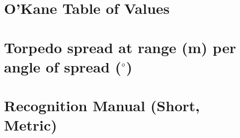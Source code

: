 \documentclass{article}
\newcommand{\degree}{$^{\circ}$}
\begin{document}
\section{O'Kane Table of Values}

\pagebreak

\section{Torpedo spread at range (m) per angle of spread (\degree)}


\pagebreak

\section{Recognition Manual (Short, Metric)}

\end{document}
